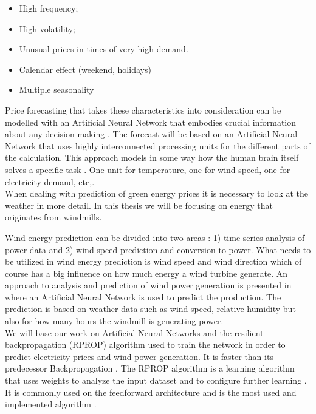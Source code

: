 \documentclass[twoside,11pt,openright]{report}
\begin{document}
\begin{itemize}
\item High frequency;
\item High volatility;
\item Unusual prices in times of very high demand.
\item Calendar effect (weekend, holidays)
\item Multiple seasonality
\end{itemize}
Price forecasting that takes these characteristics into consideration can be modelled with an Artificial Neural Network that embodies crucial information about any decision making \cite{1}. The forecast will be based on an Artificial Neural Network that uses highly interconnected processing units for the different parts of the calculation. This approach models in some way how the human brain itself solves a specific task \cite{1}\cite{2}. One unit for temperature, one for wind speed, one for electricity demand, etc,.\cite{3} 
\\[0.5cm] 
When dealing with prediction of green energy prices it is necessary to look at the weather in more detail. In this thesis we will be focusing on energy that originates from windmills. 

Wind energy prediction can be divided into two areas \cite{5}: 1) time-series analysis of power data and 2) wind speed prediction and conversion to power. What needs to be utilized in wind energy prediction is wind speed and wind direction which of course has a big influence on how much energy a wind turbine generate. An approach to analysis and prediction of wind power generation is presented in \cite{WindPowerGenerationUsingANN} where an Artificial Neural Network is used to predict the production. The prediction is based on weather data such as wind speed, relative humidity but also for how many hours the windmill is generating power. 
\\[0.5cm]
We will base our work on Artificial Neural Networks and the resilient backpropagation (RPROP) algorithm used to train the network in order to predict electricity prices and wind power generation. It is faster than its predecessor Backpropagation \cite{8,15}.  The RPROP algorithm is a learning algorithm that uses weights to analyze the input dataset and to configure further learning \cite{17}. It is commonly used on the feedforward architecture and is the most used and implemented algorithm \cite{14,17}.
\end{document}
